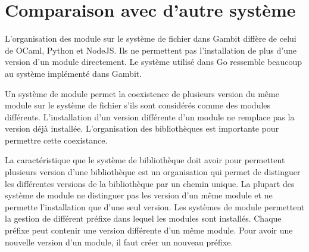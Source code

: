 \section{Comparaison avec d'autre système}

L'organisation des module sur le système de fichier dans Gambit
diffère de celui de OCaml, Python et NodeJS. Ils ne permettent pas
l'installation de plus d'une version d'un module directement. Le système
utilisé dans Go ressemble beaucoup au système implémenté dans Gambit.

Un système de module permet la coexistence de plusieurs version du même module
sur le système de fichier s'ils sont considérés comme des modules différents.
L'installation d'un version différente d'un module ne remplace pas la version
déjà installée. L'organisation des bibliothèques est importante pour permettre
cette coexistance.

La caractéristique que le système de bibliothèque doit avoir pour permettent
plusieurs version d'une bibliothèque est un organisation qui permet de distinguer
les différentes versions de la bibliothèque par un chemin unique.
La plupart des système de module ne distinguer pas les version d'un même module
et ne permette l'installation que d'une seul version. Les systèmes de module permettent
la gestion de différent préfixe dans lequel les modules sont installés. Chaque préfixe peut
contenir une version différente d'un même module. Pour avoir une nouvelle version d'un module,
il faut créer un nouveau préfixe.






